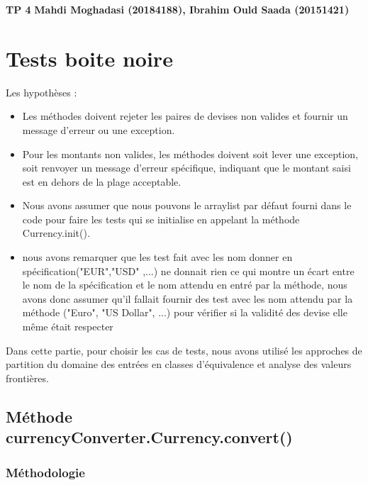 \documentclass[11pt]{article}
\begin{document}
\noindent \textbf{TP 4} \hfill \textbf{Mahdi Moghadasi (20184188), Ibrahim Ould Saada (20151421)}

\section{Tests boite noire}

Les hypothèses :
\begin{itemize}
    \item Les méthodes doivent rejeter les paires de devises non valides et fournir un message d'erreur ou une exception.
    \item Pour les montants non valides, les méthodes doivent soit lever une exception, soit renvoyer un message d'erreur spécifique, indiquant que le montant saisi est en dehors de la plage acceptable.
    \item Nous avons assumer que nous pouvons le arraylist par défaut fourni dans le code pour faire les tests qui se initialise en appelant la méthode Currency.init().
    \item nous avons remarquer que les test fait avec les nom donner en spécification("EUR","USD" ,...) ne donnait rien ce qui montre un écart entre le nom de la spécification et le nom attendu en entré par la méthode, nous avons donc assumer qu'il fallait fournir des test avec les nom attendu par la méthode ("Euro", "US Dollar", ...) pour vérifier si la validité des devise elle même était respecter
\end{itemize}

Dans cette partie, pour choisir les cas de tests, nous avons utilisé les approches de partition du domaine des entrées en classes d’équivalence et analyse des valeurs frontières.


\subsection{Méthode currencyConverter.Currency.convert()}
\subsubsection{Méthodologie}
\end{document}

